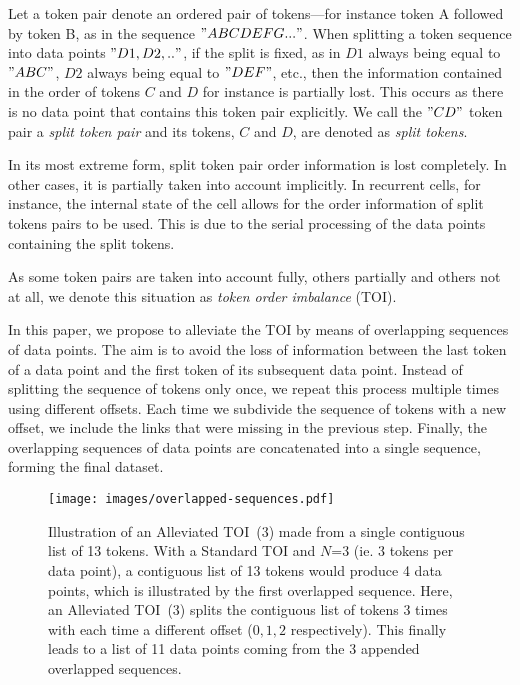 \documentclass[11pt,a4paper]{article}
\begin{document}
Let a token pair denote an ordered pair of tokens---for instance token A followed by token B, as in the sequence $"A B C D E F G ..."$.
When splitting a token sequence into data points $"D1, D2, .."$, if the split is fixed, as in $D1$ always being equal to $"A B C"$, $D2$ always being equal to $"D E F"$, etc., then the information contained in the order of tokens $C$ and $D$ for instance is partially lost. This occurs as there is no data point that contains this token pair explicitly. We call the $"C D"$ token pair a \textit{split token pair} and its tokens, $C$ and $D$, are denoted as \textit{split tokens}.

In its most extreme form, split token pair order information is lost completely. In other cases, it is partially taken into account implicitly. In recurrent cells, for instance, the internal state of the cell allows for the order information of split tokens pairs to be used. This is due to the serial processing of the data points containing the split tokens.

As some token pairs are taken into account fully, others partially and others not at all, we denote this situation as \textit{token order imbalance} (TOI).

In this paper, we propose to alleviate the TOI by means of overlapping sequences of data points. The aim is to avoid the loss of information between the last token of a data point and the first token of its subsequent data point. Instead of splitting the sequence of tokens only once, we repeat this process multiple times using different offsets. Each time we subdivide the sequence of tokens with a new offset, we include the links that were missing in the previous step. Finally, the overlapping sequences of data points are concatenated into a single sequence, forming the final dataset.

\begin{figure}
    \centering
    \texttt{[image: images/overlapped-sequences.pdf]}
    \caption{Illustration of an Alleviated TOI~(3) made from a single contiguous list of 13 tokens. With a Standard TOI and $N$=3 (ie. 3 tokens per data point), a contiguous list of 13 tokens would produce 4 data points, which is illustrated by the first overlapped sequence. Here, an Alleviated TOI~(3) splits the contiguous list of tokens 3 times with each time a different offset ($0,1,2$ respectively). This finally leads to a list of 11 data points coming from the 3 appended overlapped sequences.}
    \label{fig:overlapped sequences}
\end{figure}
\end{document}
